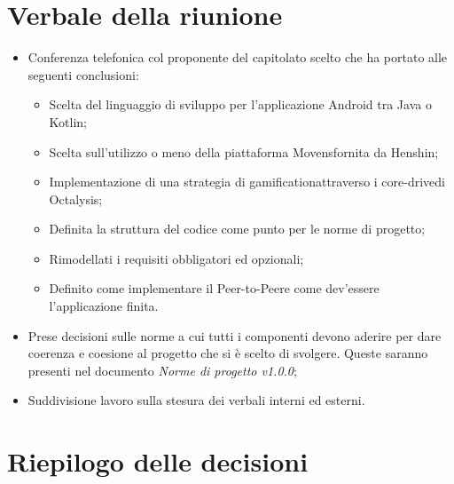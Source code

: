 \section{Verbale della riunione}
\begin{itemize}
	\item Conferenza telefonica col proponente del capitolato scelto che ha portato alle seguenti conclusioni:
	\begin{itemize}
		\item Scelta del linguaggio di sviluppo per l'applicazione Android tra Java o Kotlin\glo;
		\item Scelta sull'utilizzo o meno della piattaforma Movens\glosp fornita da Henshin\glo;
		\item Implementazione di una strategia di gamification\glosp attraverso i core-drive\glosp di Octalysis\glo;
		\item Definita la struttura del codice come punto per le norme di progetto;
		\item Rimodellati i requisiti obbligatori ed opzionali;
		\item Definito come implementare il Peer-to-Peer\glosp e come dev'essere l'applicazione finita.   
	\end{itemize}
	\item Prese decisioni sulle norme a cui tutti i componenti devono aderire per dare coerenza e coesione al progetto che
	si è scelto di svolgere. Queste saranno presenti nel documento \textit{Norme di progetto v1.0.0};
	\item Suddivisione lavoro sulla stesura dei verbali interni ed esterni. 
\end{itemize}
\pagebreak
\section{Riepilogo delle decisioni}

	
